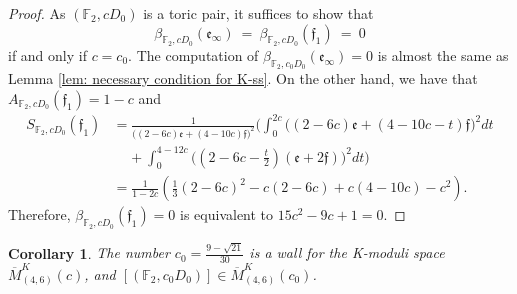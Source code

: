 \documentclass[a4paper,12pt]{amsart}
\newcommand{\ove}[1]{\overline{#1}}
\newcommand{\mtf}[1]{\mathfrak{#1}}
\newcommand{\bF}{\mathbb{F}}
\newtheorem{corollary}[theorem]{Corollary}
\theoremstyle{definition}
\theoremstyle{remark}
\begin{document}
\begin{proof}
    As $(\bF_2,cD_0)$ is a toric pair, it suffices to show that $$\beta_{\bF_2,cD_0}(\mtf{e}_{\infty})\ =\ \beta_{\bF_2,cD_0}(\mtf{f}_1)\ =\ 0$$ if and only if $c=c_0$.
    The computation of $\beta_{\bF_2,c_0D_0}(\mtf{e}_{\infty})=0$ is almost the same as Lemma \ref{lem: necessary condition for K-ss}. On the other hand, we have that $A_{\bF_2,cD_0}(\mtf{f}_1)=1-c$ and \begin{equation}\nonumber
   \begin{split}
    S_{\bF_2,cD_0}(\mtf{f}_1)&=\frac{1}{\big((2-6c)\mtf{e}+(4-10c)\mtf{f}\big)^2}\bigg(\int_0^{2c}\big((2-6c)\mtf{e}+(4-10c-t)\mtf{f}\big)^2dt\\
    & \ \ \ \ \  + \int_0^{4-12c}\big((2-6c-{\textstyle \frac{t}{2}})(\mtf{e}+2\mtf{f})\big)^2dt\bigg) \\
    &=\frac{1}{1-2c}\left(\frac{1}{3}(2-6c)^2-c(2-6c)+c(4-10c)-c^2 \right).
    \end{split}
    \end{equation}
    Therefore, $\beta_{\bF_2,cD_0}(\mtf{f}_1)=0$ is equivalent to $15c^2-9c+1=0$.
\end{proof}

\begin{corollary}
    The number $c_0=\frac{9-\sqrt{21}}{30}$ is a wall for the K-moduli space $\ove{M}^K_{(4,6)}(c)$, and $[(\bF_2,c_0D_0)]\in \ove{M}^K_{(4,6)}(c_0)$. 
\end{corollary}

    


\end{document}
